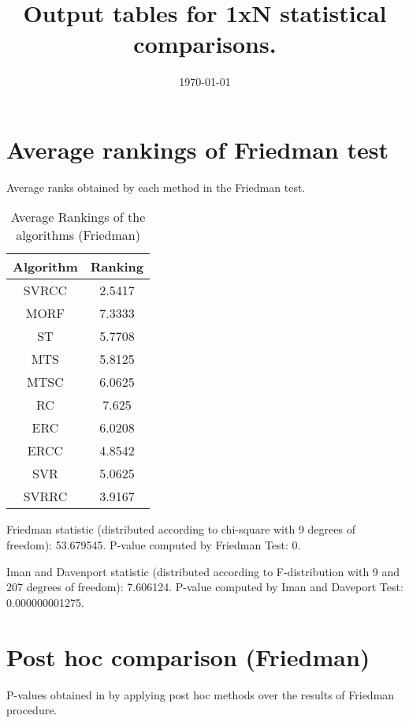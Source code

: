 \documentclass[a4paper,10pt]{article}
\title{Output tables for 1xN statistical comparisons.}
\author{}
\date{\today}
\begin{document}
\begin{landscape}
\pagestyle{empty}
\maketitle
\thispagestyle{empty}

\section{Average rankings of Friedman test}


Average ranks obtained by each method in the Friedman test.

\begin{table}[!htp]
\centering
\begin{tabular}{|c|c|}\hline
Algorithm&Ranking\\\hline
SVRCC&2.5417\\MORF&7.3333\\ST&5.7708\\MTS&5.8125\\MTSC&6.0625\\RC&7.625\\ERC&6.0208\\ERCC&4.8542\\SVR&5.0625\\SVRRC&3.9167\\\hline\end{tabular}
\caption{Average Rankings of the algorithms (Friedman)}
\end{table}

Friedman statistic (distributed according to chi-square with 9 degrees of freedom): 53.679545. \newline P-value computed by Friedman Test: 0.\newline

Iman and Davenport statistic (distributed according to F-distribution with 9 and 207 degrees of freedom): 7.606124. \newline P-value computed by Iman and Daveport Test: 0.000000001275.\newline


\newpage

\section{Post hoc comparison (Friedman)}


P-values obtained in by applying post hoc methods over the results of Friedman procedure.


\end{landscape}
\end{document}
